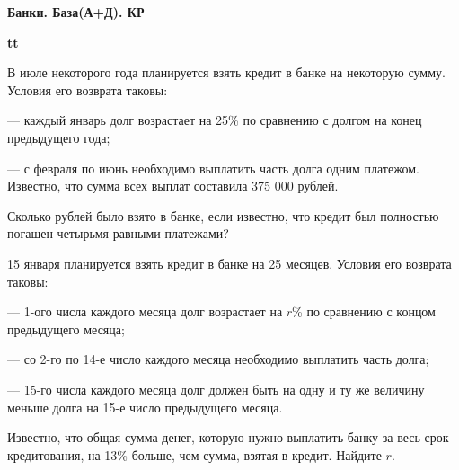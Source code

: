 \centerline{\bf \Huge Банки. База(А+Д). КР}
\centerline{\bf \Huge }

\begin{flushright}
        \scriptsize{\textbf{tt}}
\end{flushright}


 В июле некоторого года планируется взять кредит в банке на некоторую сумму. Условия его возврата таковы:

— каждый январь долг возрастает на 25\% по сравнению с долгом на конец предыдущего
года;

— с февраля по июнь необходимо выплатить часть долга одним платежом.
Известно, что сумма всех выплат составила 375 000 рублей. 

Сколько рублей было взято в банке, если известно, что кредит был полностью погашен четырьмя равными платежами?

 15 января планируется взять кредит в банке на 25 месяцев. Условия его возврата таковы:

— 1-ого числа каждого месяца долг возрастает на $r$\% по сравнению с концом предыдущего
месяца;

— со 2-го по 14-е число каждого месяца необходимо выплатить часть долга;

— 15-го числа каждого месяца долг должен быть на одну и ту же величину меньше долга
на 15-е число предыдущего месяца.

Известно, что общая сумма денег, которую нужно выплатить банку за весь срок кредитования, на 13\% больше, чем сумма, взятая в кредит. Найдите $r$.

